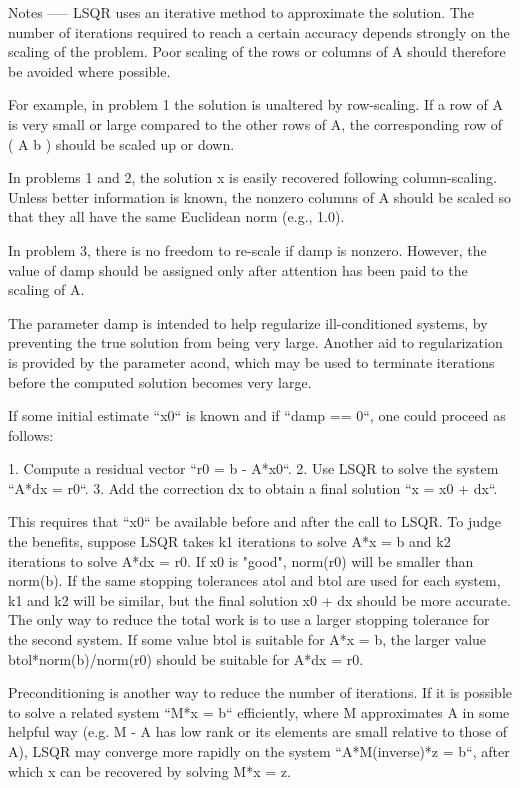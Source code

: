 \begin{DoxyVerb}
Notes
-----
LSQR uses an iterative method to approximate the solution.  The
number of iterations required to reach a certain accuracy depends
strongly on the scaling of the problem.  Poor scaling of the rows
or columns of A should therefore be avoided where possible.

For example, in problem 1 the solution is unaltered by
row-scaling.  If a row of A is very small or large compared to
the other rows of A, the corresponding row of ( A  b ) should be
scaled up or down.

In problems 1 and 2, the solution x is easily recovered
following column-scaling.  Unless better information is known,
the nonzero columns of A should be scaled so that they all have
the same Euclidean norm (e.g., 1.0).

In problem 3, there is no freedom to re-scale if damp is
nonzero.  However, the value of damp should be assigned only
after attention has been paid to the scaling of A.

The parameter damp is intended to help regularize
ill-conditioned systems, by preventing the true solution from
being very large.  Another aid to regularization is provided by
the parameter acond, which may be used to terminate iterations
before the computed solution becomes very large.

If some initial estimate ``x0`` is known and if ``damp == 0``,
one could proceed as follows:

  1. Compute a residual vector ``r0 = b - A*x0``.
  2. Use LSQR to solve the system  ``A*dx = r0``.
  3. Add the correction dx to obtain a final solution ``x = x0 + dx``.

This requires that ``x0`` be available before and after the call
to LSQR.  To judge the benefits, suppose LSQR takes k1 iterations
to solve A*x = b and k2 iterations to solve A*dx = r0.
If x0 is "good", norm(r0) will be smaller than norm(b).
If the same stopping tolerances atol and btol are used for each
system, k1 and k2 will be similar, but the final solution x0 + dx
should be more accurate.  The only way to reduce the total work
is to use a larger stopping tolerance for the second system.
If some value btol is suitable for A*x = b, the larger value
btol*norm(b)/norm(r0)  should be suitable for A*dx = r0.

Preconditioning is another way to reduce the number of iterations.
If it is possible to solve a related system ``M*x = b``
efficiently, where M approximates A in some helpful way (e.g. M -
A has low rank or its elements are small relative to those of A),
LSQR may converge more rapidly on the system ``A*M(inverse)*z =
b``, after which x can be recovered by solving M*x = z.


\end{DoxyVerb}
